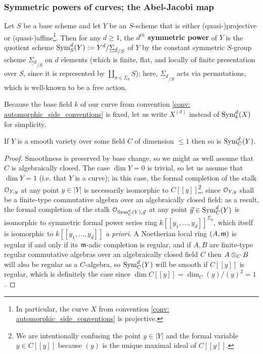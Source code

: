         \subsubsection{Symmetric powers of curves; the Abel-Jacobi map}
            \begin{definition} \label{def: symmetric_powers_of_schemes}
                Let $S$ be a base scheme and let $Y$ be an $S$-scheme that is either (quasi-)projective or (quasi-)affine\footnote{In particular, the curve $X$ from convention \ref{conv: automorphic_side_conventions} is projective.}. Then for any $d \geq 1$, the \textbf{$d^{th}$ symmetric power} of $Y$ is the quotient scheme $\mathrm{Sym}^d_S(Y) := Y^d/\underline{\Sigma_d}_{/S}$ of $Y$ by the constant symmetric $S$-group scheme $\underline{\Sigma_d}_{/S}$ on $d$ elements (which is finite, flat, and locally of finite presentation over $S$, since it is represented by $\coprod_{\sigma \in \Sigma_d} S$); here, $\underline{\Sigma_d}_{/S}$ acts via permutations, which is well-known to be a free action.
            \end{definition}
            \begin{convention}
                Because the base field $k$ of our curve from convention \ref{conv: automorphic_side_conventions} is fixed, let us write $X^{(d)}$ instead of $\mathrm{Sym}^d_k(X)$ for simplicity.
            \end{convention}
            \begin{lemma} \label{lemma: smoothness_of_symmetric_powers}
                If $Y$ is a smooth variety over some field $C$ of dimension $\leq 1$ then so is $\mathrm{Sym}_C^d(Y)$.
            \end{lemma}
                \begin{proof}
                    Smoothness is preserved by base change, so we might as well assume that $C$ is algebraically closed. The case $\dim Y = 0$ is trivial, so let us assume that $\dim Y = 1$ (i.e. that $Y$ is a curve); in this case, the formal completion of the stalk $\mathcal{O}_{Y, y}$ at any point $y \in |Y|$ is necessarily isomorphic to $C[\![y]\!]$\footnote{We are intentionally confusing the point $y \in |Y|$ and the formal variable $y \in C[\![y]\!]$ because $(y)$ is the unique maximal ideal of $C[\![y]\!]$.}, since $\mathcal{O}_{Y, y}$ shall be a finite-type commutative algebra over an algebraically closed field; as a result, the formal completion of the stalk $\mathcal{O}_{\mathrm{Sym}^d_C(Y), \vec{y}}$ at any point $\vec{y} \in \mathrm{Sym}^d_C(Y)$ is isomorphic to symmetric formal power series ring $k[\![y_1, ..., y_d]\!]^{\Sigma_d}$, which itself is isomorphic to $k[\![y_1, ..., y_d]\!]$ \textit{a priori}. A Noetherian local ring $(A, \mathfrak{m})$ is regular if and only if its $\mathfrak{m}$-adic completion is regular, and if $A, B$ are finite-type regular commutative algebras over an algebraically closed field $C$ then $A \tensor_C B$ will also be regular as a $C$-algebra, so $\mathrm{Sym}_C^d(Y)$ will be smooth if $C[\![y]\!]$ is regular, which is definitely the case since $\dim C[\![y]\!] = \dim_C (y)/(y)^2 = 1$.
                \end{proof}
